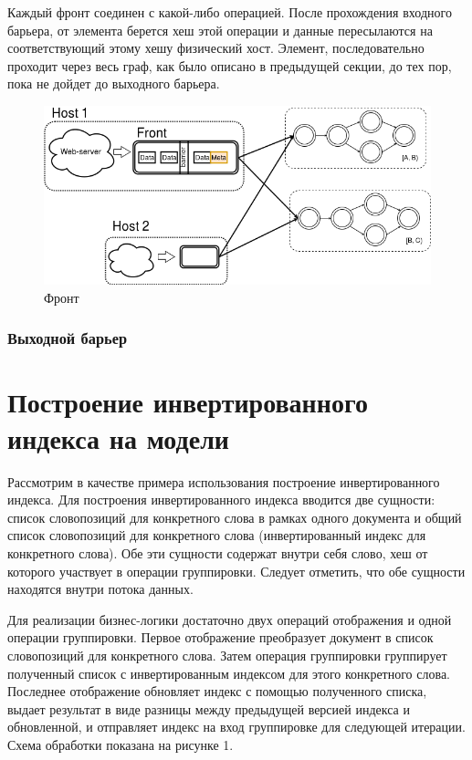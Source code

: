\documentclass[14pt]{matmex-diploma-custom}
\begin{document}
Каждый фронт соединен с какой-либо операцией. После прохождения входного барьера, от элемента берется хеш этой операции и данные пересылаются на соответствующий этому хешу физический хост. Элемент, последовательно проходит через весь граф, как было описано в предыдущей секции, до тех пор, пока не дойдет до выходного барьера.

\begin{figure}
  \centering
	\includegraphics[width=1.0\textwidth]{pics/front.png}
	\caption{Фронт}
\end{figure}

\subsubsection{Выходной барьер}


\section{Построение инвертированного индекса на модели}

Рассмотрим в качестве примера использования построение инвертированного индекса. Для построения инвертированного индекса вводится две сущности: список словопозиций для конкретного слова в рамках одного документа и общий список словопозиций для конкретного слова (инвертированный индекс для конкретного слова). Обе эти сущности содержат внутри себя слово, хеш от которого участвует в операции группировки. Следует отметить, что обе сущности находятся внутри потока данных.

Для реализации бизнес-логики достаточно двух операций отображения и одной операции группировки. Первое отображение преобразует документ в список словопозиций для конкретного слова. Затем операция группировки группирует полученный список с инвертированным индексом для этого конкретного слова. Последнее отображение обновляет индекс с помощью полученного списка, выдает результат в виде разницы между предыдущей версией индекса и обновленной, и отправляет индекс на вход группировке для следующей итерации. Схема обработки показана на рисунке 1.
\end{document}
